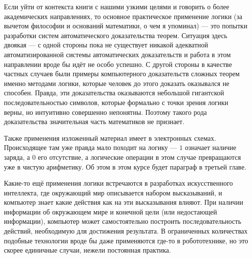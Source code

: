 Если уйти от контекста книги с нашими узкими целями и говорить о более академических направлениях, то основное практическое применение логики (за вычетом философии и оснований математики, о чем я упоминал) --- это попытки разработки систем автоматического доказательства теорем. Ситуация здесь двоякая --- с одной стороны пока не существует никакой адекватной автоматизированной системы автоматических доказательств и работа в этом направлении вроде бы идёт не особо успешно. С другой стороны в качестве частных случаев были примеры компьютерного доказательств сложных теорем именно методами логики, которые человек до этого доказать оказывался не способен. Правда, эти доказательства оказываются небольшой гигантской последовательностью символов, которые формально с точки зрения логики верны, но интуитивно совершенно непонятны. Поэтому такого рода доказательства значительная часть математиков не признает.

Также применения изложенный материал имеет в электронных схемах. Происходящее там уже правда мало походит на логику --- $1$ означает наличие заряда, а $0$ его отсутствие, а логические операции в этом случае превращаются уже в чистую арифметику. Об этом в этом курсе будет параграф в третьей главе.

Какие-то ещё применения логики встречаются в разработках искусственного интеллекта, где окружающий мир описывается набором высказываний, и компьютер знает какие действия как на эти высказывания влияют. При наличии информации об окружающем мире и конечной цели (или недостающей информации), компьютер может самостоятельно построить последовательность действий, необходимую для достижения результата. В ограниченных количествах подобные технологии вроде бы даже применяются где-то в робототехнике, но это скорее единичные случаи, нежели постоянная практика.

